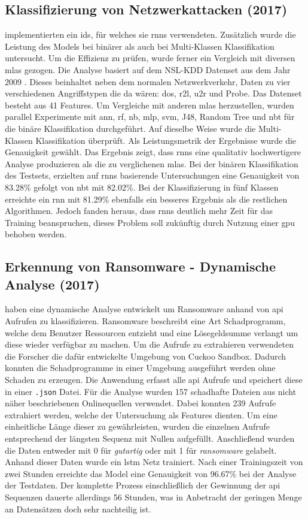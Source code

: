 \documentclass[
    12pt, %
    DIV10,
    ngerman, %
    a4paper, %
    oneside, %
    titlepage, %
    parskip=half, %
    headings=normal, %
    listof=totoc, %
    bibliography=totoc, %
    index=totoc, %
    captions=tableheading, %
    final %
]{scrreprt}
\begin{document}
\subsection{Klassifizierung von Netzwerkattacken (2017)}\label{yin}
\textcite{Yin2017} implementierten ein \ac{ids}, für welches sie \ac{rnns} verwendeten. Zusätzlich wurde die Leistung des Models bei binärer als auch bei Multi-Klassen Klassifikation untersucht. Um die Effizienz zu prüfen, wurde ferner ein Vergleich mit diversen \ac{mlas} gezogen. Die Analyse basiert auf dem NSL-KDD Datenset aus dem Jahr 2009 \parencite{Cybersecurity}. Dieses beinhaltet neben dem normalen Netzwerkverkehr, Daten zu vier verschiedenen Angriffstypen die da wären: \ac{dos}, \ac{r2l}, \ac{u2r} und Probe. Das Datenset besteht aus 41 Features. Um Vergleiche mit anderen \ac{mlas} herzustellen, wurden parallel Experimente mit \ac{ann}, \ac{rf}, \ac{nb}, \ac{mlp}, \ac{svm}, J48, Random Tree und \ac{nbt} für die binäre Klassifikation durchgeführt. Auf dieselbe Weise wurde die Multi-Klassen Klassifikation überprüft. Als Leistungsmetrik der Ergebnisse wurde die Genauigkeit gewählt. Das Ergebnis zeigt, dass \ac{rnns} eine qualitativ hochwertigere Analyse produzieren als die zu verglichenen \ac{mlas}. Bei der binären Klassifikation des Testsets, erzielten auf \ac{rnns} basierende Untersuchungen eine Genauigkeit von 83.28\% gefolgt von \ac{nbt} mit 82.02\%. Bei der Klassifizierung in fünf Klassen erreichte ein \ac{rnn} mit 81.29\% ebenfalls ein besseres Ergebnis als die restlichen Algorithmen. Jedoch fanden \textcite{Yin2017} heraus, dass \ac{rnns} deutlich mehr Zeit für das Training beanspruchen, dieses Problem soll zukünftig durch Nutzung einer \ac{gpu} behoben werden.
%
\subsection{Erkennung von Ransomware - Dynamische Analyse (2017)}
\textcite{Maniath2018} haben eine dynamische Analyse entwickelt um Ransomware anhand von \ac{api} Aufrufen zu klassifizieren. Ransomware beschreibt eine Art Schadprogramm, welche dem Benutzer Ressourcen entzieht und eine Lösegeldsumme verlangt um diese wieder verfügbar zu machen. Um die Aufrufe zu extrahieren verwendeten die Forscher die dafür entwickelte Umgebung von Cuckoo Sandbox. Dadurch konnten die Schadprogramme in einer Umgebung ausgeführt werden ohne Schaden zu erzeugen. Die Anwendung erfasst alle \ac{api} Aufrufe und speichert diese in einer \texttt{.json} Datei. Für die Analyse wurden 157 schadhafte Dateien aus nicht näher beschriebenen Onlinequellen verwendet. Dabei konnten 239 Aufrufe extrahiert werden, welche der Untersuchung als Features dienten. Um eine einheitliche Länge dieser zu gewährleisten, wurden die einzelnen Aufrufe entsprechend der längsten Sequenz mit Nullen aufgefüllt. Anschlie{\ss}end wurden die Daten entweder mit 0 für \emph{gutartig} oder mit 1 für \emph{ransomware} gelabelt. Anhand dieser Daten wurde ein \ac{lstm} Netz trainiert. Nach einer Trainingszeit von zwei Stunden erreichte das Model eine Genauigkeit von 96.67\% bei der Analyse der Testdaten. Der komplette Prozess einschlie{\ss}lich der Gewinnung der \ac{api} Sequenzen dauerte allerdings 56 Stunden, was in Anbetracht der geringen Menge an Datensätzen doch sehr nachteilig ist.
%
\end{document}
